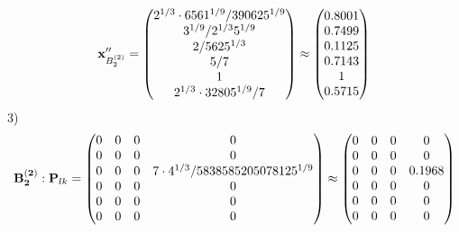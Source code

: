 \documentclass[10pt,a4paper]{article}
\begin{document}
	\[
		\bold{x}''_{B_2^{(2)}} = 
		\begin{pmatrix}
			{{2^ {1 / 3}} \cdot {6561^ {1 / 9}}} / {{390625^ {1 / 9}}} \\
			{{3^ {1 / 9}}} / {{2^ {1 / 3}}{5^ {1 / 9}}} \\
			{{2}} / {{5625^ {1 / 3}}} \\
			{{5}} / {{7}} \\
			{1}{} \\
			{{2^ {1 / 3}} \cdot {32805^ {1 / 9}}} / {{7}} \\
		\end{pmatrix}
		\approx
		\begin{pmatrix}
			0.8001   \\
			0.7499   \\
			0.1125   \\
			0.7143   \\
			1        \\
			0.5715   \\
		\end{pmatrix}
	\]
	3)
	\[
		\bold{B_2^{(2)}}: \bold{P}_{lk} = 
		\begin{pmatrix}
			{{0}}{} & {{0}}{} & {{0}}{} & {{0}}{} \\
			{{0}}{} & {{0}}{} & {{0}}{} & {{0}}{} \\
			{{0}}{} & {{0}}{} & {{0}}{} & {{7} \cdot {4^ {1 / 3}}} / {{5838585205078125^ {1 / 9}}} \\
			{{0}}{} & {{0}}{} & {{0}}{} & {{0}}{} \\
			{{0}}{} & {{0}}{} & {{0}}{} & {{0}}{} \\
			{{0}}{} & {{0}}{} & {{0}}{} & {{0}}{} \\
		\end{pmatrix}
		\approx
		\begin{pmatrix}
			0        & 0        & 0        & 0        \\
			0        & 0        & 0        & 0        \\
			0        & 0        & 0        & 0.1968   \\
			0        & 0        & 0        & 0        \\
			0        & 0        & 0        & 0        \\
			0        & 0        & 0        & 0        \\
		\end{pmatrix}
	\]
\end{document}

